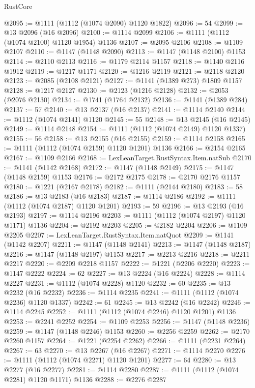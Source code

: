 \begin{lexlean}{RustCore}
\begin{coremodule}
@2095 := @1111 (@1112 (@1074 @2090) @1120 @1822)
@2096 := 54
@2099 := @13 @2096 (@16 @2096)
@2100 := @1114 @2099
@2106 := @1111 (@1112 (@1074 @2100) @1120 @1954) @1136
@2107 := @2095 @2106
@2108 := @1109 @2107
@2110 := @1147 (@1148 @2090)
@2113 := @1147 (@1148 @2100) @1153
@2114 := @2110 @2113
@2116 := @1179 @2114 @1157
@2118 := @1140 @2116 @1912
@2119 := @1217 @1171
@2120 := @1216 @2119
@2121 := @2118 @2120
@2123 := @2085 (@2108 @2121)
@2127 := @1141 (@1389 @273) @1809 @1157
@2128 := @1217 @2127
@2130 := @2123 (@1216 @2128)
@2132 := @2053 (@2076 @2130)
@2134 := @1741 (@1764 @2132)
@2136 := @1141 (@1389 @284)
@2137 := 57
@2140 := @13 @2137 (@16 @2137)
@2141 := @1114 @2140
@2144 := @1112 (@1074 @2141) @1120
@2145 := 55
@2148 := @13 @2145 (@16 @2145)
@2149 := @1114 @2148
@2154 := @1111 (@1112 (@1074 @2149) @1120 @1337)
@2155 := 56
@2158 := @13 @2155 (@16 @2155)
@2159 := @1114 @2158
@2165 := @1111 (@1112 (@1074 @2159) @1120 @1201) @1136
@2166 := @2154 @2165
@2167 := @1109 @2166
@2168 := LexLeanTarget.RustSyntax.Item.natSub
@2170 := @1141 (@1142 @2168)
@2172 := @1147 (@1148 @2149)
@2175 := @1147 (@1148 @2159) @1153
@2176 := @2172 @2175
@2178 := @2170 @2176 @1157
@2180 := @1221 (@2167 @2178)
@2182 := @1111 (@2144 @2180)
@2183 := 58
@2186 := @13 @2183 (@16 @2183)
@2187 := @1114 @2186
@2192 := @1111 (@1112 (@1074 @2187) @1120 @1201)
@2193 := 59
@2196 := @13 @2193 (@16 @2193)
@2197 := @1114 @2196
@2203 := @1111 (@1112 (@1074 @2197) @1120 @1171) @1136
@2204 := @2192 @2203
@2205 := @2182 @2204
@2206 := @1109 @2205
@2207 := LexLeanTarget.RustSyntax.Item.natQuot
@2209 := @1141 (@1142 @2207)
@2211 := @1147 (@1148 @2141)
@2213 := @1147 (@1148 @2187)
@2216 := @1147 (@1148 @2197) @1153
@2217 := @2213 @2216
@2218 := @2211 @2217
@2220 := @2209 @2218 @1157
@2222 := @1221 (@2206 @2220)
@2223 := @1147 @2222
@2224 := 62
@2227 := @13 @2224 (@16 @2224)
@2228 := @1114 @2227
@2231 := @1112 (@1074 @2228) @1120
@2232 := 60
@2235 := @13 @2232 (@16 @2232)
@2236 := @1114 @2235
@2241 := @1111 (@1112 (@1074 @2236) @1120 @1337)
@2242 := 61
@2245 := @13 @2242 (@16 @2242)
@2246 := @1114 @2245
@2252 := @1111 (@1112 (@1074 @2246) @1120 @1201) @1136
@2253 := @2241 @2252
@2254 := @1109 @2253
@2256 := @1147 (@1148 @2236)
@2259 := @1147 (@1148 @2246) @1153
@2260 := @2256 @2259
@2262 := @2170 @2260 @1157
@2264 := @1221 (@2254 @2262)
@2266 := @1111 (@2231 @2264)
@2267 := 63
@2270 := @13 @2267 (@16 @2267)
@2271 := @1114 @2270
@2276 := @1111 (@1112 (@1074 @2271) @1120 @1201)
@2277 := 64
@2280 := @13 @2277 (@16 @2277)
@2281 := @1114 @2280
@2287 := @1111 (@1112 (@1074 @2281) @1120 @1171) @1136
@2288 := @2276 @2287

\end{coremodule}
\end{lexlean}
